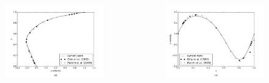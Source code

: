 \begin{frame}
\begin{center}
\begin{columns}[c]
\begin{column}{0.25\textwidth}
\begin{tikzpicture}[scale=0.6]
\end{tikzpicture}
\end{column}
\end{columns}
\end{center}
\vspace{-0.6cm}
\begin{center}
\begin{columns}[c]
\begin{column}{0.55\textwidth} 
\begin{figure}
  \centering
  \includegraphics[scale=0.33]{images/Re_100_u_profile.pdf}
\end{figure}
\end{column}
\begin{column}{0.65\textwidth} 
\begin{figure}
  \centering
  \includegraphics[scale=0.33]{images/Re_100_v_profile.pdf}

\end{figure}
\end{column}
\end{columns}
\end{center}
\end{frame}
